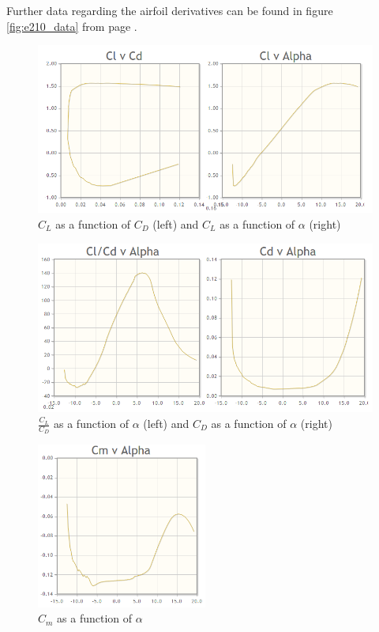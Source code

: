 \documentclass[english,fira]{ist-report}
\begin{document}
Further data regarding the airfoil derivatives can be found in figure \ref{fig:e210_data} from page \pageref{fig:e210_data}.

\begin{figure}[ht]
    \centering
    \includegraphics[width=\textwidth]{graphics/WingDesign/airfoilgraphs1.png}
    \caption{$C_L$ as a function of $C_D$ (left) and $C_L$ as a function of $\alpha$ (right)}
    \label{fig:airfoilgraphs1}
\end{figure}


\begin{figure}[ht]
    \centering
    \includegraphics[width=\textwidth]{graphics/WingDesign/airfoilgraphs2.png}
    \caption{$\frac{C_L}{C_D}$ as a function of $\alpha$ (left) and $C_D$ as a function of $\alpha$ (right)}
    \label{fig:airfoilgraphs2}
\end{figure}


\begin{figure}[ht]
    \centering
    \includegraphics[width=0.5\textwidth]{graphics/WingDesign/airfoilgraphs3.png}
    \caption{$C_m$ as a function of $\alpha$}
    \label{fig:airfoilgraphs3}
\end{figure}
\end{document}
